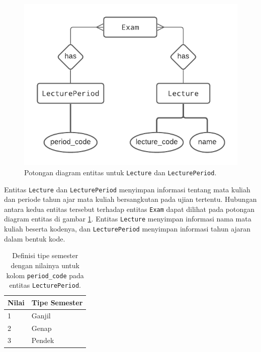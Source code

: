    \begin{figure}
        \centering
        \includegraphics{Gambar/erd-details/ERD--New - Lecture & LecturePeriod.pdf}
        \caption{Potongan diagram entitas untuk \texttt{Lecture} dan
        \texttt{LecturePeriod}.}
        \label{fig:erd_lecture-lectureperiod}
    \end{figure}

    Entitas \texttt{Lecture} dan \texttt{LecturePeriod} menyimpan informasi
    tentang mata kuliah dan periode tahun ajar mata kuliah bersangkutan pada
    ujian tertentu. Hubungan antara kedua entitas tersebut terhadap entitas
    \texttt{Exam} dapat dilihat pada potongan diagram entitas di gambar
    \ref{fig:erd_lecture-lectureperiod}.  Entitas \texttt{Lecture} menyimpan
    informasi nama mata kuliah beserta kodenya, dan \texttt{LecturePeriod}
    menyimpan informasi tahun ajaran dalam bentuk kode.
    
    \begin{table}[]
        \centering
        \caption{Definisi tipe semester dengan nilainya untuk kolom
            \texttt{period\_code} pada entitas \texttt{LecturePeriod}.}
        \label{tab:lecture-periode}
        \begin{tabular}{|l|l|}
        \hline
        Nilai & Tipe Semester \\ \hline
        1     & Ganjil        \\ \hline
        2     & Genap         \\ \hline
        3     & Pendek        \\ \hline
        \end{tabular}
    \end{table}
    
